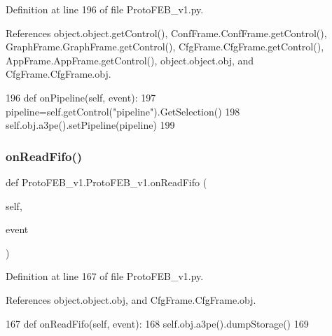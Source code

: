 Definition at line 196 of file Proto\+F\+E\+B\+\_\+v1.\+py.



References object.\+object.\+get\+Control(), Conf\+Frame.\+Conf\+Frame.\+get\+Control(), Graph\+Frame.\+Graph\+Frame.\+get\+Control(), Cfg\+Frame.\+Cfg\+Frame.\+get\+Control(), App\+Frame.\+App\+Frame.\+get\+Control(), object.\+object.\+obj, and Cfg\+Frame.\+Cfg\+Frame.\+obj.


\begin{DoxyCode}
196     \textcolor{keyword}{def }onPipeline(self, event):
197         pipeline=self.getControl(\textcolor{stringliteral}{"pipeline"}).GetSelection()
198         self.obj.a3pe().setPipeline(pipeline)
199 
\end{DoxyCode}
\mbox{\label{classProtoFEB__v1_1_1ProtoFEB__v1_a592ffa0a854e0bb583e6b19910950cc7}} 
\subsubsection{\texorpdfstring{on\+Read\+Fifo()}{onReadFifo()}}
{\footnotesize\ttfamily def Proto\+F\+E\+B\+\_\+v1.\+Proto\+F\+E\+B\+\_\+v1.\+on\+Read\+Fifo (\begin{DoxyParamCaption}\item[{}]{self,  }\item[{}]{event }\end{DoxyParamCaption})}



Definition at line 167 of file Proto\+F\+E\+B\+\_\+v1.\+py.



References object.\+object.\+obj, and Cfg\+Frame.\+Cfg\+Frame.\+obj.


\begin{DoxyCode}
167     \textcolor{keyword}{def }onReadFifo(self, event):
168         self.obj.a3pe().dumpStorage()
169 
\end{DoxyCode}
\mbox{\label{classProtoFEB__v1_1_1ProtoFEB__v1_acd0a2f2aaa8759c090a7d1a5ac57cbd5}} 

